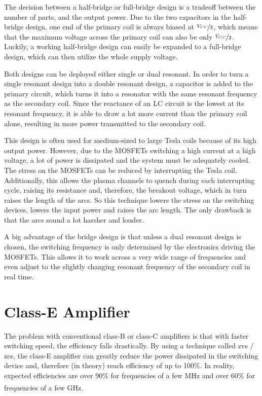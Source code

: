 The decision between a half-bridge or full-bridge design is a tradeoff between the number of parts, and the output power. Due to the two capacitors in the half-bridge design, one end of the primary coil is always biased at  \(\nicefrac{V_{CC}}{2}\), which means that the maximum voltage across the primary coil can also be only \(\nicefrac{V_{CC}}{2}\). Luckily, a working half-bridge design can easily be expanded to a full-bridge design, which can then utilize the whole supply voltage.

Both designs can be deployed either single or dual resonant. In order to turn a single resonant design into a double resonant design, a capacitor is added to the primary circuit, which turns it into a resonator with the same resonant frequency as the secondary coil. Since the reactance of an LC circuit is the lowest at its resonant frequency, it is able to draw a lot more current than the primary coil alone, resulting in more power transmitted to the secondary coil.

This design is often used for medium-sized to large Tesla coils because of its high output power. However, due to the MOSFETs switching a high current at a high voltage, a lot of power is dissipated and the system must be adequately cooled. The stress on the MOSFETs can be reduced by interrupting the Tesla coil. Additionally, this allows the plasma channels to quench during each interrupting cycle, raising its resistance and, therefore, the breakout voltage, which in turn raises the length of the arcs. So this technique lowers the stress on the switching devices, lowers the input power and raises the arc length. The only drawback is that the arcs sound a lot harsher and louder.

A big advantage of the bridge design is that unless a dual resonant design is chosen, the switching frequency is only determined by the electronics driving the MOSFETs. This allows it to work across a very wide range of frequencies and even adjust to the slightly changing resonant frequency of the secondary coil in real time.

\section{Class-E Amplifier}

The problem with conventional class-B or class-C amplifiers is that with faster switching speed, the efficiency falls drastically. By using a technique called \gls{zvs} / \gls{zcs}, the class-E amplifier can greatly reduce the power dissipated in the switching device and, therefore (in theory) reach efficiency of up to 100\%. In reality, expected efficiencies are over 90\% for frequencies of a few MHz and over 60\% for frequencies of a few GHz\textsuperscript{}.

